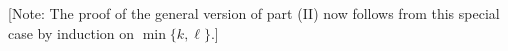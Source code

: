 \documentclass[11pt, reqno]{amsart}
\theoremstyle{plain}
\theoremstyle{definition}
\theoremstyle{example}
\begin{document}
\begin{enumerate}[1.]
\begin{enumerate}
\begin{enumerate}[(i)]
{\footnotesize[Note: The proof of the general version of part (II) now follows from this special case by induction on $\min\{k, \ell\}$.]}
\end{enumerate}
\end{enumerate}



\end{enumerate}
\end{document}

